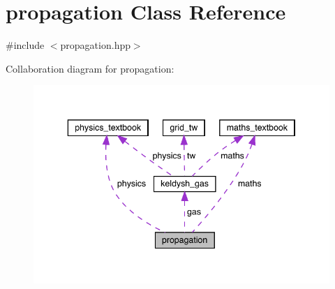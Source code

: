 \hypertarget{classpropagation}{}\section{propagation Class Reference}
\label{classpropagation}


{\ttfamily \#include $<$propagation.\+hpp$>$}



Collaboration diagram for propagation\+:\nopagebreak
\begin{figure}[H]
\begin{center}
\leavevmode
\includegraphics[width=343pt]{classpropagation__coll__graph}
\end{center}
\end{figure}
